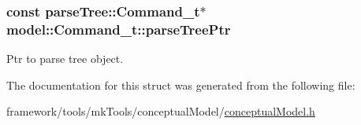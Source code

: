 \subsubsection[{\texorpdfstring{parse\+Tree\+Ptr}{parseTreePtr}}]{\setlength{\rightskip}{0pt plus 5cm}const {\bf parse\+Tree\+::\+Command\+\_\+t}$\ast$ model\+::\+Command\+\_\+t\+::parse\+Tree\+Ptr}\hypertarget{structmodel_1_1_command__t_a5944afd6bd2cffd69608749987ae9894}{}\label{structmodel_1_1_command__t_a5944afd6bd2cffd69608749987ae9894}


Ptr to parse tree object. 



The documentation for this struct was generated from the following file\+:\begin{DoxyCompactItemize}
\item 
framework/tools/mk\+Tools/conceptual\+Model/\hyperlink{conceptual_model_8h}{conceptual\+Model.\+h}\end{DoxyCompactItemize}
